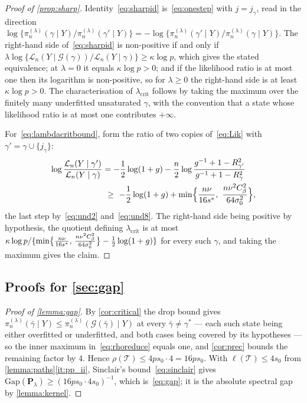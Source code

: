 \begin{proof}[Proof of \cref{prop:sharp}]
    Identity~\eqref{eq:sharpid} is~\eqref{eq:onestep} with
    $j=j_\gamma$, read in the direction
    $\log\{\pi_n^{(\lambda)}(\gamma\mid Y)/
    \pi_n^{(\lambda)}(\gamma'\mid Y)\}
    =-\log\{\pi_n^{(\lambda)}(\gamma'\mid Y)/
    \pi_n^{(\lambda)}(\gamma\mid Y)\}$. The right-hand side
    of~\eqref{eq:sharpid} is non-positive if and only if
    $\lambda\log\{\mathcal{L}_n(Y\mid\mathcal{G}(\gamma))/
    \mathcal{L}_n(Y\mid\gamma)\}\geq\kappa\log p$, which gives the stated
    equivalence; at $\lambda=0$ it equals $\kappa\log p>0$; and if the
    likelihood ratio is at most one then its logarithm is non-positive, so
    for $\lambda\geq0$ the right-hand side is at least $\kappa\log p>0$.
    The characterisation of $\lambda_{\mathrm{crit}}$ follows by taking
    the maximum over the finitely many underfitted unsaturated $\gamma$,
    with the convention that a state whose likelihood ratio is at most one
    contributes $+\infty$.

    For~\eqref{eq:lambdacritbound}, form the ratio of two copies
    of~\eqref{eq:Lik} with $\gamma'=\gamma\cup\{j_\gamma\}$:
    \begin{align*}
        \log\frac{\mathcal{L}_n(Y\mid\gamma')}
        {\mathcal{L}_n(Y\mid\gamma)}
        &=-\frac12\log(1+g)
        -\frac n2\log\frac{g^{-1}+1-R^{2}_{\gamma'}}
        {g^{-1}+1-R^{2}_{\gamma}}\\
        &\ \geq\ -\frac12\log(1+g)+\min\Bigl\{\frac{n\nu}{16s^{\ast}},\ \frac{n\nu^{2}C_\beta^{2}}{64\sigma_0^{2}}\Bigr\} ,
    \end{align*}
    the last step by~\eqref{eq:und2} and~\eqref{eq:und8}. The right-hand
    side being positive by hypothesis, the quotient defining
    $\lambda_{\mathrm{crit}}$ is at most
    $\kappa\log p/\{\min\bigl\{\tfrac{n\nu}{16s^{\ast}},\, \tfrac{n\nu^{2}C_\beta^{2}}{64\sigma_0^{2}}\bigr\}-\tfrac12\log(1+g)\}$ for every such
    $\gamma$, and taking the maximum gives the claim.
\end{proof}

\subsection{Proofs for \cref{sec:gap}}
\label{sub:appgap}

\begin{proof}[Proof of \cref{lemma:gap}]
    By \cref{cor:critical} the drop bound gives
    $\pi_n^{(\lambda)}(\bar\gamma\mid Y)\leq
    \pi_n^{(\lambda)}(\mathcal{G}(\bar\gamma)\mid Y)$ at every
    $\bar\gamma\neq\gamma^{\ast}$ --- each such state being either
    overfitted or underfitted, and both cases being covered by its
    hypotheses --- so the inner maximum in~\eqref{eq:rhoreduce} equals
    one, and \cref{cor:prec} bounds the remaining factor by $4$. Hence
    $\rho(\mathcal{T})\leq4ps_0\cdot4=16ps_0$. With
    $\ell(\mathcal{T})\leq4s_0$ from
    \cref{lemma:paths}\ref{it:pp_ii}, Sinclair's
    bound~\eqref{eq:sinclair} gives
    $\mathrm{Gap}(\mathbf{P}_\lambda)\geq(16ps_0\cdot4s_0)^{-1}$, which
    is~\eqref{eq:gap}; it is the absolute spectral gap by
    \cref{lemma:kernel}.
\end{proof}

